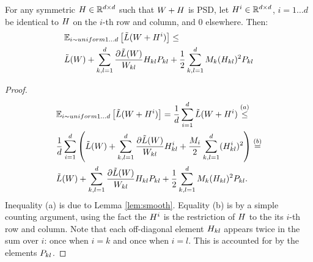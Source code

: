 \documentclass{article}
\begin{document}
\begin{applemma}\label{applem:ESO}
For any symmetric ${H} \in \mathbb{R}^{d \times d}$ such that ${W} + {H}$ is PSD, let ${H}^i \in \mathbb{R}^{d \times d}$, $i=1 \ldots d$ be identical to ${H}$  on the $i$-th row and column, and $0$ elsewhere. Then:
\begin{align*}
&\mathbb{E}_{i \sim uniform 1 \ldots d} \left[ \tilde{L}({W} + {H}^i) \right] \leq \\
&\tilde{L}({W}) + \sum_{k,l=1}^d  \frac{\partial \tilde{L}({W})}{{W}_{kl}} {H}_{kl} {P}_{kl} + \frac{1}{2} \sum_{k,l=1}^d   M_k ({H}_{kl})^2 {P}_{kl}
\end{align*}
\end{applemma}

\begin{proof}
\begin{align*}
&\mathbb{E}_{i \sim uniform 1 \ldots d} \left[ \tilde{L}({W} + {H}^i) \right] = \frac{1}{d} \sum_{i=1}^d \tilde{L}({W} + {H}^i) \stackrel{(a)}{\leq} \\
& \frac{1}{d} \sum_{i=1}^d \left(\tilde{L}({W}) + \sum_{k,l=1}^d \frac{\partial \tilde{L}({W})}{{W}_{kl}} {H}_{kl}^i + \frac{M_i}{2} \sum_{k,l=1}^d  ({H}_{kl}^i)^2 \right) \stackrel{(b)}{=} \\
& \tilde{L}({W}) + \sum_{k,l=1}^d \frac{\partial \tilde{L}({W})}{{W}_{kl}} {H}_{kl} {P}_{kl} + \frac{1}{2} \sum_{k,l=1}^d M_k ({H}_{kl})^2 {P}_{kl}.
\end{align*}
Inequality (a) is due to Lemma \ref{lem:smooth}. Equality (b) is by a simple counting argument, using the fact the ${H}^i$ is the restriction of ${H}$ to the its $i$-th row and column. Note that each off-diagonal element ${H}_{kl}$ appears twice in the sum over $i$: once when $i=k$ and once when $i=l$. This is accounted for by the elements ${P}_{kl}$.
\end{proof}
\end{document}
